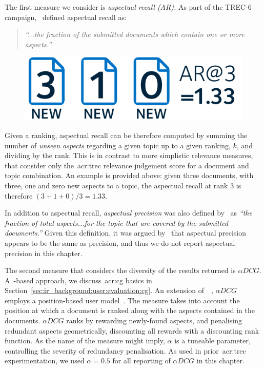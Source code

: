 The first measure we consider is \emph{aspectual recall (AR).} As part of the TREC-6 campaign,~\cite{over1998trec} defined aspectual recall as:

\begin{quote}
    \emph{``...the fraction of the submitted documents which contain one or more aspects.''}
\end{quote}

\begin{figure}
    \begin{center}
    \vspace*{-5mm}
    \includegraphics[width=1\textwidth]{figures/ch8-aspectual_recall.pdf}
    \end{center}
    \vspace*{-4mm}
    \label{fig:aspectual_recall}
\end{figure}

Given a ranking, aspectual recall can be therefore computed by summing the number of \emph{unseen aspects} regarding a given topic up to a given ranking, $k$, and dividing by the rank. This is in contrast to more simplistic relevance measures, that consider only the~\gls{acr:trec} relevance judgement score for a document and topic combination. An example is provided above: given three documents, with three, one and zero new aspects to a topic, the aspectual recall at rank 3 is therefore $(3+1+0)/3 = 1.33$.

In addition to aspectual recall, \emph{aspectual precision} was also defined by~\cite{over2001trec} as \emph{``the fraction of total aspects...for the topic that are covered by the submitted documents.''} Given this definition, it was argued by~\cite{sanderson2010test} that aspectual precision appears to be the same as precision, and thus we do not report aspectual precision in this chapter.

The second measure that considers the diversity of the results returned is $\alpha DCG$. A~-based approach, we discuss~\gls{acr:cg} basics in Section~\ref{sec:ir_background:user:evaluation:cg}. An extension of~~\citep{jarvelin2002cg}, $\alpha DCG$ employs a position-based user model~\citep{clarke2008adcg}. The measure takes into account the position at which a document is ranked along with the aspects contained in the documents. $\alpha DCG$ ranks by rewarding newly-found aspects, and penalising redundant aspects geometrically, discounting all rewards with a discounting rank function. As the name of the measure might imply, $\alpha$ is a tuneable parameter, controlling the severity of redundancy penalisation. As used in prior~\gls{acr:trec} experimentation, we used $\alpha=0.5$ for all reporting of $\alpha DCG$ in this chapter.


